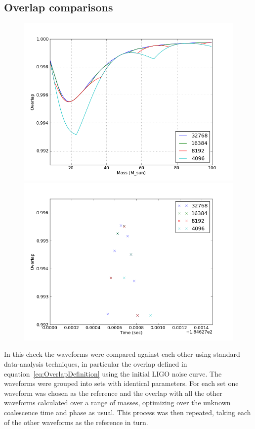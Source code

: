 \subsection{Overlap comparisons}


\begin{figure}
  \includegraphics[width=0.5\linewidth]{figures/ninja2/resolutions}
  \includegraphics[width=0.5\linewidth]{figures/ninja2/overlap_time_series}
  \caption[Sensitivity of the overlaps to sample rate]{
  \label{f:overlap_sample_frequency}
}
\end{figure}%

In this check the waveforms were compared against each other using
standard data-analysis techniques, in particular the overlap defined
in equation~\ref{eq:OverlapDefinition}  using the initial LIGO noise
curve.  The waveforms were grouped into sets with identical
parameters.  For each set one waveform was chosen as the reference and
the overlap with all the other waveforms calculated over a range of
masses, optimizing over the unknown coalescence time and phase as
usual.  This process was then repeated, taking each of the other
waveforms as the reference in turn.

